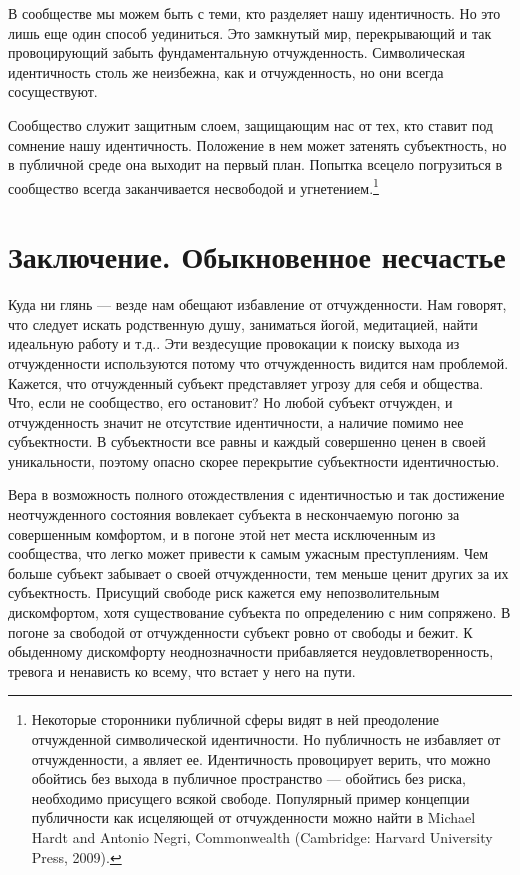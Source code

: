 \documentclass[12pt]{book}
\begin{document}
В сообществе мы можем быть с теми, кто разделяет нашу идентичность. Но это лишь еще один способ уединиться. Это замкнутый мир, перекрывающий и так провоцирующий забыть фундаментальную отчужденность. Символическая идентичность столь же неизбежна, как и отчужденность, но они всегда сосуществуют.

Сообщество служит защитным слоем, защищающим нас от тех, кто ставит под сомнение нашу идентичность. Положение в нем может затенять субъектность, но в публичной среде она выходит на первый план. Попытка всецело погрузиться в сообщество всегда заканчивается несвободой и угнетением.\footnote{Некоторые сторонники публичной сферы видят в ней преодоление отчужденной символической идентичности. Но публичность не избавляет от отчужденности, а являет ее. Идентичность провоцирует верить, что можно обойтись без выхода в публичное пространство --- обойтись без риска, необходимо присущего всякой свободе. Популярный пример концепции публичности как исцеляющей от отчужденности можно найти в Michael Hardt and Antonio Negri, Commonwealth (Cambridge: Harvard University Press, 2009).}

\chapter{Заключение. Обыкновенное несчастье}

Куда ни глянь --- везде нам обещают избавление от отчужденности. Нам говорят, что следует искать родственную душу, заниматься йогой, медитацией, найти идеальную работу и т.д.. Эти вездесущие провокации к поиску выхода из отчужденности используются потому что отчужденность видится нам проблемой. Кажется, что отчужденный субъект представляет угрозу для себя и общества. Что, если не сообщество, его остановит? Но любой субъект отчужден, и отчужденность значит не отсутствие идентичности, а наличие помимо нее субъектности. В субъектности все равны и каждый совершенно ценен в своей уникальности, поэтому опасно скорее перекрытие субъектности идентичностью.

Вера в возможность полного отождествления с идентичностью и так достижение неотчужденного состояния вовлекает субъекта в нескончаемую погоню за совершенным комфортом, и в погоне этой нет места исключенным из сообщества, что легко может привести к самым ужасным преступлениям. Чем больше субъект забывает о своей отчужденности, тем меньше ценит других за их субъектность. Присущий свободе риск кажется ему непозволительным дискомфортом, хотя существование субъекта по определению с ним сопряжено. В погоне за свободой от отчужденности субъект ровно от свободы и бежит. К обыденному дискомфорту неоднозначности прибавляется неудовлетворенность, тревога и ненависть ко всему, что встает у него на пути.
\end{document}
